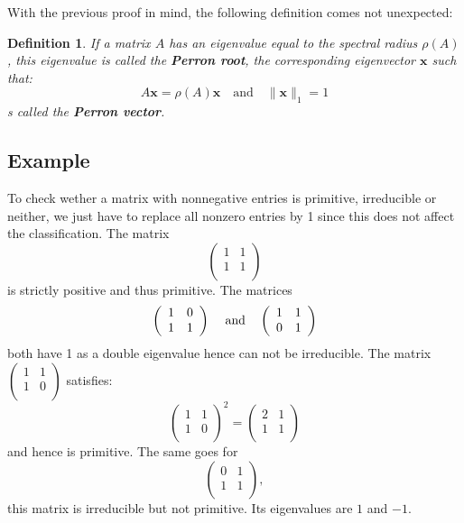 \documentclass[a4paper,11pt]{report}
\newtheorem{definition}[theorem]{Definition}
\begin{document}
   
   With the previous proof in mind, the following definition comes not unexpected:
   
   \begin{definition}\label{perronroot}
     If a matrix $A$ has an eigenvalue equal to the spectral radius $\rho(A)$, this eigenvalue
     is called the \textbf{Perron root}, the corresponding eigenvector $\mathbf{x}$ such that:
     $$A\mathbf{x} = \rho(A)\mathbf{x} \quad \text{and} \quad \|\mathbf{x}\|_1 = 1$$s called 
     the \textbf{Perron vector}.
   \end{definition}

  

\subsection{Example}
To check wether a matrix with nonnegative entries is primitive, irreducible or 
neither, we just have to replace all nonzero entries by 1 since this does not 
affect the classification. The matrix
$$\left(\begin{array}{cc}
1 & 1\\
1 & 1 \\
\end{array}\right)$$
is strictly positive and thus primitive. The matrices
$$\left(\begin{array}{cc}
1 & 0\\
1 & 1 \\
\end{array}\right) \text{\;\;\; and \;\;\,} 
\left(\begin{array}{cc}
1 & 1\\
0 & 1 \\
\end{array}\right)$$
both have 1 as a double eigenvalue hence can not be irreducible.
The matrix $\left(\begin{array}{cc}
1 & 1\\
1 & 0 \\
\end{array}\right)$ satisfies:
$$\left(\begin{array}{cc}
1 & 1\\
1 & 0 \\
\end{array}\right)^2 = \left(\begin{array}{cc}
2 & 1\\
1 & 1 \\
\end{array}\right)$$
and hence is primitive. The same goes for $$\left(\begin{array}{cc}
0 & 1\\
1 & 1 \\
\end{array}\right),$$ this matrix is irreducible but not primitive. Its 
eigenvalues are $1$ and $-1$.
\end{document}
